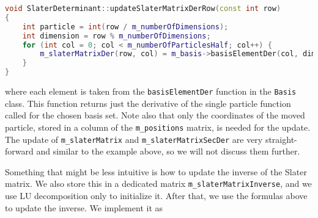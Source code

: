 \begin{lstlisting}[language={c++}]
void SlaterDeterminant::updateSlaterMatrixDerRow(const int row)
{
	int particle = int(row / m_numberOfDimensions);
	int dimension = row % m_numberOfDimensions;
	for (int col = 0; col < m_numberOfParticlesHalf; col++) {
		m_slaterMatrixDer(row, col) = m_basis->basisElementDer(col, dimension, m_positions.col(particle));
	}
}
\end{lstlisting}
where each element is taken from the \lstinline{basisElementDer} function in the \lstinline{Basis} class. This function returns just the derivative of the single particle function called for the chosen basis set. Note also that only the coordinates of the moved particle, stored in a column of the \lstinline{m_positions} matrix, is needed for the update. The update of \lstinline{m_slaterMatrix} and \lstinline{m_slaterMatrixSecDer} are very straight-forward and similar to the example above, so we will not discuss them further.

Something that might be less intuitive is how to update the inverse of the Slater matrix. We also store this in a dedicated matrix \lstinline{m_slaterMatrixInverse}, and we use LU decomposition only to initialize it. After that, we use the formulas above to update the inverse. We implement it as

